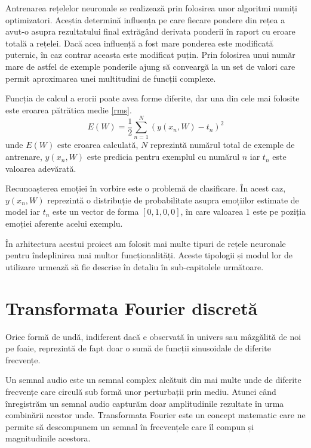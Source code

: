 \documentclass[a4paper,12pt]{book}
\begin{document}
			Antrenarea rețelelor neuronale se realizează prin folosirea unor algoritmi numiți optimizatori. Aceștia determină influența pe care fiecare pondere din rețea a avut-o asupra rezultatului final extrăgând derivata ponderii în raport cu eroare totală a rețelei. Dacă acea influență a fost mare ponderea este modificată puternic, în caz contrar aceasta este modificat puțin. Prin folosirea unui număr mare de astfel de exemple ponderile ajung să conveargă la un set de valori care permit aproximarea unei multitudini de funcții complexe. \par
			
			Funcția de calcul a erorii poate avea forme diferite, dar una din cele mai folosite este eroarea pătrătica medie \ref{rms}.
			\begin{equation} \label{rms}
				E(W) = \frac{1}{2} \sum_{n=1}^{N} (y(x_n, W) - t_n)^2
			\end{equation}
			unde $E(W)$ este eroarea calculată, $N$ reprezintă numărul total de exemple de antrenare, $y(x_n, W)$ este predicia pentru exemplul cu numărul $n$ iar $t_n$ este valoarea adevărată. \par
			
			Recunoașterea emoției în vorbire este o problemă de clasificare. În acest caz, $y(x_n, W)$ reprezintă o distribuție de probabilitate asupra emoțiilor estimate de model iar $t_n$ este un vector de forma $[0,1,0,0]$, în care valoarea $1$ este pe poziția emoției aferente acelui exemplu. \par
			
			În arhitectura acestui proiect am folosit mai multe tipuri de rețele neuronale pentru îndeplinirea mai multor funcționalități. Aceste tipologii și modul lor de utilizare urmează să fie descrise în detaliu în sub-capitolele următoare.
			\section{Transformata Fourier discretă} 
			
			Orice formă de undă, indiferent dacă e observată în univers sau mâzgălită de noi pe foaie, reprezintă de fapt doar o sumă de funcții sinusoidale de diferite frecvențe.\par
			
			Un semnal audio este un semnal complex alcătuit din mai multe unde de diferite frecvențe care circulă sub formă unor perturbații prin mediu. Atunci când înregistrăm un semnal audio capturăm doar amplitudinile rezultate în urma combinării acestor unde. Transformata Fourier este un concept matematic care ne permite să descompunem un semnal în frecvențele care îl compun și magnitudinile acestora.\par 
			
\end{document}
